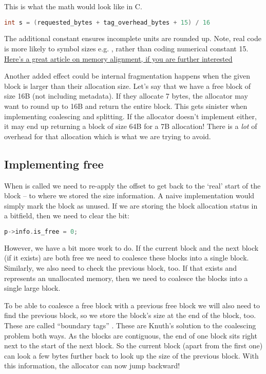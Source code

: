 This is what the math would look like in C.

\begin{lstlisting}[language=C]
int s = (requested_bytes + tag_overhead_bytes + 15) / 16
\end{lstlisting}

The additional constant ensures incomplete units are rounded up. Note, real code is more likely to symbol sizes e.g. , rather than coding numerical constant 15.
\href{http://www.ibm.com/developerworks/library/pa-dalign/}{Here's a great article on memory alignment, if you are further interested}

Another added effect could be internal fragmentation happens when the given block is larger than their allocation size.
Let's say that we have a free block of size 16B (not including metadata).
If they allocate 7 bytes, the allocator may want to round up to 16B and return the entire block.
This gets sinister when implementing coalescing and splitting.
If the allocator doesn't implement either, it may end up returning a block of size 64B for a 7B allocation!
There is a \emph{lot} of overhead for that allocation which is what we are trying to avoid.

\subsection{Implementing free}

When  is called we need to re-apply the offset to get back to the `real' start of the block -- to where we stored the size information.
A naive implementation would simply mark the block as unused.
If we are storing the block allocation status in a bitfield, then we need to clear the bit:

\begin{lstlisting}[language=C]
p->info.is_free = 0;
\end{lstlisting}

However, we have a bit more work to do.
If the current block and the next block (if it exists) are both free we need to coalesce these blocks into a single block.
Similarly, we also need to check the previous block, too.
If that exists and represents an unallocated memory, then we need to coalesce the blocks into a single large block.

To be able to coalesce a free block with a previous free block we will also need to find the previous block, so we store the block's size at the end of the block, too.
These are called ``boundary tags'' \cite{knuth1973art}.
These are Knuth's solution to the coalescing problem both ways.
As the blocks are contiguous, the end of one block sits right next to the start of the next block.
So the current block (apart from the first one) can look a few bytes further back to look up the size of the previous block.
With this information, the allocator can now jump backward!

